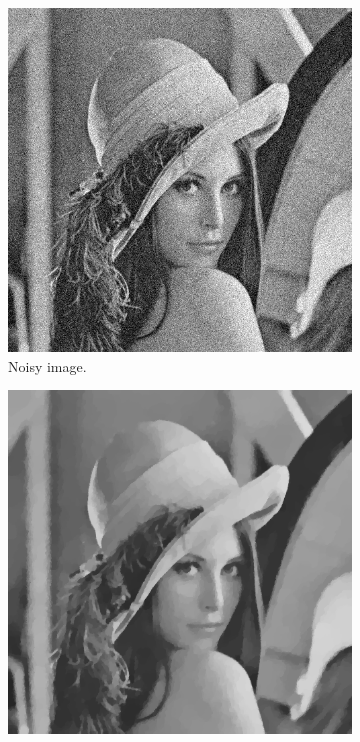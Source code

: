 \documentclass[abstracton]{scrreprt}
\begin{document}
            \begin{figure}[!ht]
                \centering
                \begin{subfigure}[b]{0.244\textwidth}
                    \includegraphics[width=\textwidth]{img/images/lena_gauss_noise.png}
                    \caption{Noisy image.\newline}
                \end{subfigure}
                \begin{subfigure}[b]{0.244\textwidth}
                    \includegraphics[width=\textwidth]{img/denoising/gauss_noise/003lena.png}

\end{subfigure}
\end{figure}
\end{document}
